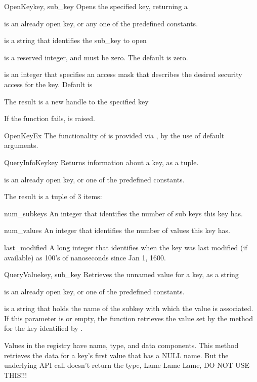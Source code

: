 \begin{funcdesc}{OpenKey}{key, sub_key}
  Opens the specified key, returning a 

  is an already open key, or any one of the predefined
  constants.

  is a string that identifies the sub_key to open
 
  is a reserved integer, and must be zero.  The default is zero.
 
  is an integer that specifies an access mask that describes 
 the desired security access for the key.  Default is 
 
 The result is a new handle to the specified key
 
 If the function fails,  is raised.
\end{funcdesc}


\begin{funcdesc}{OpenKeyEx}{}
  The functionality of  is provided via
  , by the use of default arguments.
\end{funcdesc}


\begin{funcdesc}{QueryInfoKey}{key}
 Returns information about a key, as a tuple.

  is an already open key, or one of the predefined 
  constants.

 The result is a tuple of 3 items:
 \item[num_subkeys]
 An integer that identifies the number of sub keys this key has.
 \item[num_values]
 An integer that identifies the number of values this key has.
 \item [last_modified]
 A long integer that identifies when the key was last modified (if available)
 as 100's of nanoseconds since Jan 1, 1600.
\end{funcdesc}


\begin{funcdesc}{QueryValue}{key, sub_key}
 Retrieves the unnamed value for a key, as a string

  is an already open key, or one of the predefined 
  constants.

  is a string that holds the name of the subkey with which 
 the value is associated.  If this parameter is  or empty, the 
 function retrieves the value set by the  method 
 for the key identified by .

 Values in the registry have name, type, and data components. This 
 method retrieves the data for a key's first value that has a NULL name.
 But the underlying API call doesn't return the type, Lame Lame Lame,
 DO NOT USE THIS!!!
\end{funcdesc}


